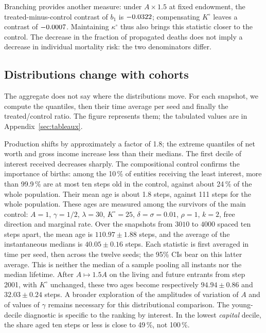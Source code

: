 Branching provides another measure: under $A\times1.5$ at fixed
endowment, the treated-minus-control contrast of $b_1$ is
$-0.0322$; compensating $K^\circ$ leaves a contrast of
$-0.0007$. Maintaining $\kappa^\circ$ thus also
brings this statistic closer to the control. The decrease in the
fraction of propagated deaths does not imply a decrease in individual
mortality risk: the two denominators differ.

\subsection{Distributions change with cohorts}\label{sec:ou}
The aggregate does not say where the distributions move. For each
snapshot, we compute the quantiles, then their time average per seed
and finally the treated/control ratio. The figure represents them; the
tabulated values are in Appendix~\ref{sec:tableaux}.


Production shifts by approximately a factor of 1.8; the extreme
quantiles of net worth and gross income increase less than their
medians. The first decile of interest received decreases sharply. The
compositional control confirms the importance of births: among the
10\,\% of entities receiving the least interest, more than 99.9\,\% are
at most ten steps old in the control, against about 24\,\% of the whole
population. Their mean age is about 1.8 steps, against 111 steps for
the whole population. These ages are measured among the survivors of
the main control: $A=1$, $\gamma=1/2$, $\lambda=30$, $K^\circ=25$,
$\delta=\sigma=0.01$, $\rho=1$, $k=2$, free direction and marginal rate.
Over the snapshots from $3010$ to $4000$ spaced ten steps apart, the
mean age is $110.97\pm1.88$ steps, and the average of the instantaneous
medians is $40.05\pm0.16$ steps. Each statistic is first averaged in
time per seed, then across the twelve seeds; the 95\% CIs bear on this
latter average. This is neither the median of a sample pooling all
instants nor the median lifetime. After $A\mapsto1.5A$ on the living
and future entrants from step 2001, with $K^\circ$ unchanged, these two
ages become respectively $94.94\pm0.86$ and $32.03\pm0.24$ steps. A
broader exploration of the amplitudes of variation of $A$ and of values
of $\gamma$ remains necessary for this distributional comparison. The
young-decile diagnostic is specific to the ranking by interest. In the
lowest \emph{capital} decile, the share aged ten steps or less is close
to 49\,\%, not 100\,\%.

